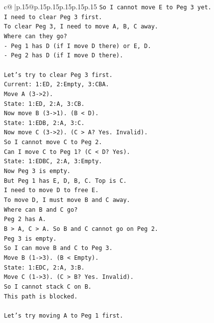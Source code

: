 \documentclass{article}
\begin{document}
{\begin{supertabular}{c@{$\;$}|p{.15\linewidth}@{}p{.15\linewidth}p{.15\linewidth}p{.15\linewidth}p{.15\linewidth}p{.15\linewidth}}
{{{\texttt{So I cannot move E to Peg 3 yet.} \\
\texttt{I need to clear Peg 3 first.} \\
\texttt{To clear Peg 3, I need to move A, B, C away.} \\
\texttt{Where can they go?} \\
\texttt{{-} Peg 1 has D (if I move D there) or E, D.} \\
\texttt{{-} Peg 2 has D (if I move D there).} \\
\\ 
\texttt{Let's try to clear Peg 3 first.} \\
\texttt{Current: 1:ED, 2:Empty, 3:CBA.} \\
\texttt{Move A (3{-}>2).} \\
\texttt{State: 1:ED, 2:A, 3:CB.} \\
\texttt{Now move B (3{-}>1). (B < D).} \\
\texttt{State: 1:EDB, 2:A, 3:C.} \\
\texttt{Now move C (3{-}>2). (C > A? Yes. Invalid).} \\
\texttt{So I cannot move C to Peg 2.} \\
\texttt{Can I move C to Peg 1? (C < D? Yes).} \\
\texttt{State: 1:EDBC, 2:A, 3:Empty.} \\
\texttt{Now Peg 3 is empty.} \\
\texttt{But Peg 1 has E, D, B, C. Top is C.} \\
\texttt{I need to move D to free E.} \\
\texttt{To move D, I must move B and C away.} \\
\texttt{Where can B and C go?} \\
\texttt{Peg 2 has A.} \\
\texttt{B > A, C > A. So B and C cannot go on Peg 2.} \\
\texttt{Peg 3 is empty.} \\
\texttt{So I can move B and C to Peg 3.} \\
\texttt{Move B (1{-}>3). (B < Empty).} \\
\texttt{State: 1:EDC, 2:A, 3:B.} \\
\texttt{Move C (1{-}>3). (C > B? Yes. Invalid).} \\
\texttt{So I cannot stack C on B.} \\
\texttt{This path is blocked.} \\
\\ 
\texttt{Let's try moving A to Peg 1 first.} \\
}}}
\end{supertabular}}
\end{document}
